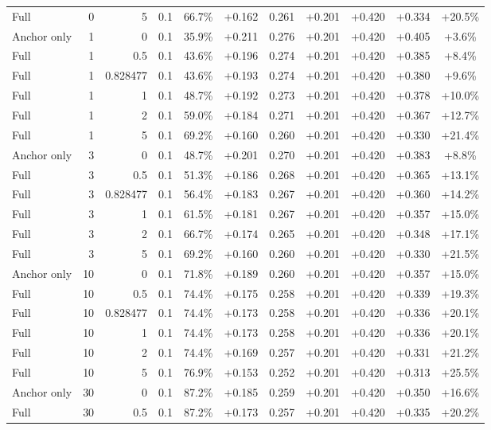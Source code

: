 \begin{table}[htbp]
\begin{tabular}{lrrrccccccc}
Full & 0 & 5 & 0.1 & 66.7\% & +0.162 & 0.261 & +0.201 & +0.420 & +0.334 & +20.5\% \\
Anchor only & 1 & 0 & 0.1 & 35.9\% & +0.211 & 0.276 & +0.201 & +0.420 & +0.405 & +3.6\% \\
Full & 1 & 0.5 & 0.1 & 43.6\% & +0.196 & 0.274 & +0.201 & +0.420 & +0.385 & +8.4\% \\
Full & 1 & 0.828477 & 0.1 & 43.6\% & +0.193 & 0.274 & +0.201 & +0.420 & +0.380 & +9.6\% \\
Full & 1 & 1 & 0.1 & 48.7\% & +0.192 & 0.273 & +0.201 & +0.420 & +0.378 & +10.0\% \\
Full & 1 & 2 & 0.1 & 59.0\% & +0.184 & 0.271 & +0.201 & +0.420 & +0.367 & +12.7\% \\
Full & 1 & 5 & 0.1 & 69.2\% & +0.160 & 0.260 & +0.201 & +0.420 & +0.330 & +21.4\% \\
Anchor only & 3 & 0 & 0.1 & 48.7\% & +0.201 & 0.270 & +0.201 & +0.420 & +0.383 & +8.8\% \\
Full & 3 & 0.5 & 0.1 & 51.3\% & +0.186 & 0.268 & +0.201 & +0.420 & +0.365 & +13.1\% \\
Full & 3 & 0.828477 & 0.1 & 56.4\% & +0.183 & 0.267 & +0.201 & +0.420 & +0.360 & +14.2\% \\
Full & 3 & 1 & 0.1 & 61.5\% & +0.181 & 0.267 & +0.201 & +0.420 & +0.357 & +15.0\% \\
Full & 3 & 2 & 0.1 & 66.7\% & +0.174 & 0.265 & +0.201 & +0.420 & +0.348 & +17.1\% \\
Full & 3 & 5 & 0.1 & 69.2\% & +0.160 & 0.260 & +0.201 & +0.420 & +0.330 & +21.5\% \\
Anchor only & 10 & 0 & 0.1 & 71.8\% & +0.189 & 0.260 & +0.201 & +0.420 & +0.357 & +15.0\% \\
Full & 10 & 0.5 & 0.1 & 74.4\% & +0.175 & 0.258 & +0.201 & +0.420 & +0.339 & +19.3\% \\
Full & 10 & 0.828477 & 0.1 & 74.4\% & +0.173 & 0.258 & +0.201 & +0.420 & +0.336 & +20.1\% \\
Full & 10 & 1 & 0.1 & 74.4\% & +0.173 & 0.258 & +0.201 & +0.420 & +0.336 & +20.1\% \\
Full & 10 & 2 & 0.1 & 74.4\% & +0.169 & 0.257 & +0.201 & +0.420 & +0.331 & +21.2\% \\
Full & 10 & 5 & 0.1 & 76.9\% & +0.153 & 0.252 & +0.201 & +0.420 & +0.313 & +25.5\% \\
Anchor only & 30 & 0 & 0.1 & 87.2\% & +0.185 & 0.259 & +0.201 & +0.420 & +0.350 & +16.6\% \\
Full & 30 & 0.5 & 0.1 & 87.2\% & +0.173 & 0.257 & +0.201 & +0.420 & +0.335 & +20.2\% \\

\end{tabular}
\end{table}
